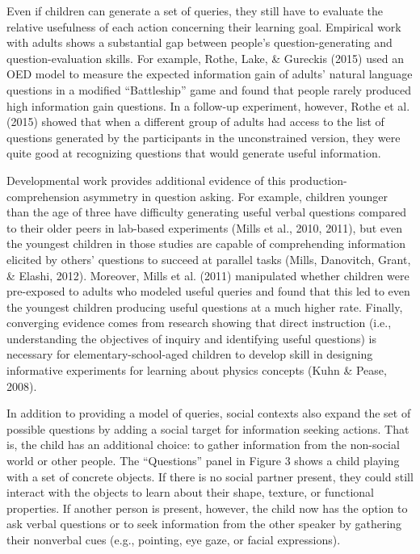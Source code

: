 \documentclass[oneside]{report}
\begin{document}
Even if children can generate a set of queries, they still have to
evaluate the relative usefulness of each action concerning their
learning goal. Empirical work with adults shows a substantial gap
between people's question-generating and question-evaluation skills. For
example, Rothe, Lake, \& Gureckis (2015) used an OED model to measure
the expected information gain of adults' natural language questions in a
modified ``Battleship'' game and found that people rarely produced high
information gain questions. In a follow-up experiment, however, Rothe et
al. (2015) showed that when a different group of adults had access to
the list of questions generated by the participants in the unconstrained
version, they were quite good at recognizing questions that would
generate useful information.

Developmental work provides additional evidence of this
production-comprehension asymmetry in question asking. For example,
children younger than the age of three have difficulty generating useful
verbal questions compared to their older peers in lab-based experiments
(Mills et al., 2010, 2011), but even the youngest children in those
studies are capable of comprehending information elicited by others'
questions to succeed at parallel tasks (Mills, Danovitch, Grant, \&
Elashi, 2012). Moreover, Mills et al. (2011) manipulated whether
children were pre-exposed to adults who modeled useful queries and found
that this led to even the youngest children producing useful questions
at a much higher rate. Finally, converging evidence comes from research
showing that direct instruction (i.e., understanding the objectives of
inquiry and identifying useful questions) is necessary for
elementary-school-aged children to develop skill in designing
informative experiments for learning about physics concepts (Kuhn \&
Pease, 2008).

In addition to providing a model of queries, social contexts also expand
the set of possible questions by adding a social target for information
seeking actions. That is, the child has an additional choice: to gather
information from the non-social world or other people. The ``Questions''
panel in Figure 3 shows a child playing with a set of concrete objects.
If there is no social partner present, they could still interact with
the objects to learn about their shape, texture, or functional
properties. If another person is present, however, the child now has the
option to ask verbal questions or to seek information from the other
speaker by gathering their nonverbal cues (e.g., pointing, eye gaze, or
facial expressions).
\end{document}
